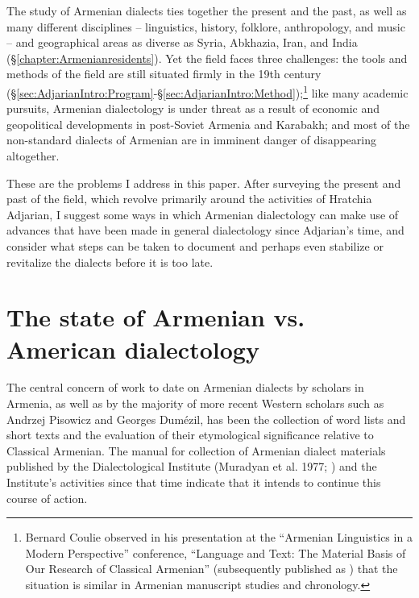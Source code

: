 \documentclass[output=paper]{langscibook}
\begin{document}
  
The study of Armenian dialects ties together the present and the past, as well as many different disciplines -- linguistics, history, folklore, anthropology, and music -- and geographical areas as diverse as Syria, Abkhazia, Iran, and India (\S\ref{chapter:Armenianresidents}). Yet the field faces three challenges: the tools and methods of the field are still situated firmly in the 19th century (\S\ref{sec:AdjarianIntro:Program}-\S\ref{sec:AdjarianIntro:Method});\footnote{Bernard Coulie observed in his presentation at the ``Armenian Linguistics in a Modern Perspective'' conference, ``Language and Text: The Material Basis of Our Research of Classical Armenian'' (subsequently published as \citealt{Coulie-2014-TextEditingArmenianPhilology}) that the situation is similar in Armenian manuscript studies and chronology. }  like many academic pursuits, Armenian dialectology is under threat as a result of economic and geopolitical developments in post-Soviet Armenia and Karabakh; and most of the non-standard dialects of Armenian are in imminent danger of disappearing altogether. 


These are the problems I address in this paper. After surveying the present and past of the field, which revolve primarily around the activities of Hratchia Adjarian, I suggest some ways in which Armenian dialectology can make use of advances that have been made in general dialectology since Adjarian's time, and consider what steps can be taken to document and perhaps even stabilize or revitalize the dialects before it is too late.


\section{The state of Armenian vs. American dialectology}\label{sec:vaux:state}


The central concern of work to date on Armenian dialects by scholars in Armenia, as well as by the majority of more recent Western scholars such as Andrzej Pisowicz and Georges Dumézil, has been the collection of word lists and short texts and the evaluation of their etymological significance relative to Classical Armenian. The manual for collection of Armenian dialect materials published by the Dialectological Institute (Muradyan et al. 1977; \citealt{MuradyanEtAl-1977-DialectologyBook}) and the Institute's activities since that time indicate that it intends to continue this course of action. 	
\end{document}

